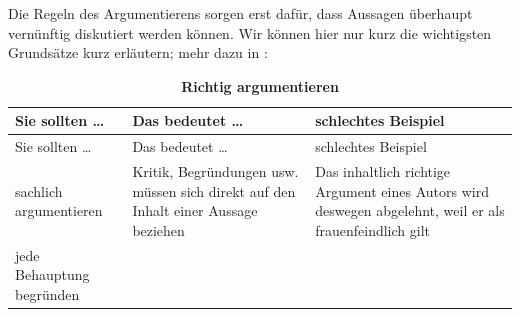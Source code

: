 \documentclass[]{book}
\theoremstyle{definition}
\theoremstyle{definition}
\theoremstyle{definition}
\theoremstyle{remark}
\begin{document}
Die Regeln des Argumentierens sorgen erst dafür, dass Aussagen überhaupt
vernünftig diskutiert werden können. Wir können hier nur kurz die
wichtigsten Grundsätze kurz erläutern; mehr dazu in
\citep{Kienpointner_1996}:

\begin{longtable}[]{@{}lll@{}}
\caption{\textbf{\label{tab:argumente2} Richtig
argumentieren}}\tabularnewline
\toprule
\begin{minipage}[b]{0.19\columnwidth}\raggedright\strut
Sie sollten \ldots{}\strut
\end{minipage} & \begin{minipage}[b]{0.39\columnwidth}\raggedright\strut
Das bedeutet \ldots{}\strut
\end{minipage} & \begin{minipage}[b]{0.33\columnwidth}\raggedright\strut
schlechtes Beispiel\strut
\end{minipage}\tabularnewline
\midrule
\endfirsthead
\toprule
\begin{minipage}[b]{0.19\columnwidth}\raggedright\strut
Sie sollten \ldots{}\strut
\end{minipage} & \begin{minipage}[b]{0.39\columnwidth}\raggedright\strut
Das bedeutet \ldots{}\strut
\end{minipage} & \begin{minipage}[b]{0.33\columnwidth}\raggedright\strut
schlechtes Beispiel\strut
\end{minipage}\tabularnewline
\midrule
\endhead
\begin{minipage}[t]{0.19\columnwidth}\raggedright\strut
sachlich argumentieren\strut
\end{minipage} & \begin{minipage}[t]{0.39\columnwidth}\raggedright\strut
Kritik, Begründungen usw. müssen sich direkt auf den Inhalt einer
Aussage beziehen\strut
\end{minipage} & \begin{minipage}[t]{0.33\columnwidth}\raggedright\strut
Das inhaltlich richtige Argument eines Autors wird deswegen abgelehnt,
weil er als frauenfeindlich gilt \vspace{-6mm}\strut
\end{minipage}\tabularnewline
\begin{minipage}[t]{0.19\columnwidth}\raggedright\strut
jede Behauptung begründen\strut
\end{minipage} & \begin{minipage}[t]{0.39\columnwidth}\raggedright\strut

\end{minipage}
\end{longtable}
\end{document}
